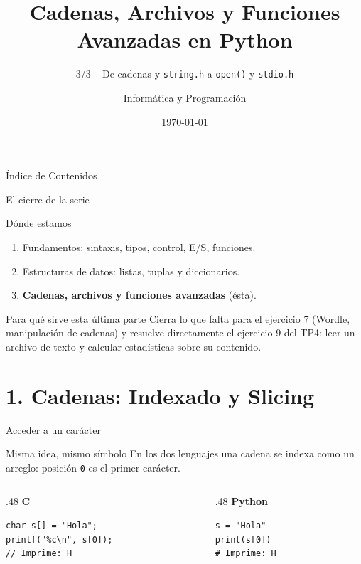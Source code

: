 \documentclass{beamer}
\title[Python desde C -- 3/3]{Cadenas, Archivos y Funciones Avanzadas en Python}
\subtitle{3/3 -- De cadenas y \texttt{string.h} a \texttt{open()} y \texttt{stdio.h}}
\author{Informática y Programación}
\date{\today}
\institute{UNCuyo -- Facultad de Ingeniería}
\begin{document}
\begin{frame}
  \titlepage
\end{frame}

\begin{frame}{Índice de Contenidos}
  \tableofcontents
\end{frame}

\begin{frame}{El cierre de la serie}
  \begin{block}{Dónde estamos}
    \begin{enumerate}
      \item Fundamentos: sintaxis, tipos, control, E/S, funciones.
      \item Estructuras de datos: listas, tuplas y diccionarios.
      \item \textbf{Cadenas, archivos y funciones avanzadas} (ésta).
    \end{enumerate}
  \end{block}
  \begin{alertblock}{Para qué sirve esta última parte}
    Cierra lo que falta para el ejercicio 7 (Wordle, manipulación de
    cadenas) y resuelve directamente el ejercicio 9 del TP4: leer un
    archivo de texto y calcular estadísticas sobre su contenido.
  \end{alertblock}
\end{frame}


\section{1. Cadenas: Indexado y Slicing}

\begin{frame}[fragile]{Acceder a un carácter}
  \begin{block}{Misma idea, mismo símbolo}
    En los dos lenguajes una cadena se indexa como un arreglo: posición
    \texttt{0} es el primer carácter.
  \end{block}
  \begin{columns}[T]
    \begin{column}{.48\textwidth}
      \centering\textbf{C}
      \begin{verbatim}
char s[] = "Hola";
printf("%c\n", s[0]);
// Imprime: H
      \end{verbatim}
    \end{column}
    \begin{column}{.48\textwidth}
      \centering\textbf{Python}
      \begin{verbatim}
s = "Hola"
print(s[0])
# Imprime: H
      \end{verbatim}
    \end{column}
  \end{columns}
\end{frame}
\end{document}

